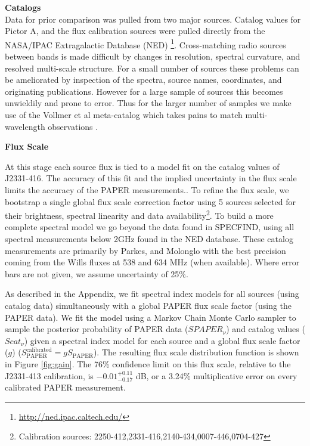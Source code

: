\documentclass[preprint]{aastex}
\newcommand{\PAPER}{\mathrm{PAPER}}
\begin{document}
\textbf{Catalogs}\\

Data for prior comparison was pulled from two major sources. Catalog values for
Pictor A, and the flux calibration sources were pulled directly from the
NASA/IPAC Extragalactic Database (NED)
\footnote{\url{http://ned.ipac.caltech.edu/}}. Cross-matching radio sources
between bands is made difficult by changes in resolution, spectral curvature,
and resolved multi-scale structure.  For a small number of sources these
problems can be ameliorated by inspection of the spectra, source names,
coordinates,  and originating publications. However for a large sample of
sources this becomes unwieldily and prone to error. Thus for the larger number
of samples we make use of the Vollmer et al meta-catalog which takes pains to
match multi-wavelength observations \citep{Vollmer:2010p6422}.


\textbf{Flux Scale}\\
\label{sec:flux_scale}

At this stage each source flux is tied to a model fit on the catalog values of
J2331-416. The accuracy of this fit and the implied uncertainty in the flux
scale limits the accuracy of the PAPER measurements..  To refine the flux
scale, we bootstrap a single global flux scale correction factor using 5
sources selected for their brightness, spectral linearity and data
availability\footnote{Calibration sources:
2250-412,2331-416,2140-434,0007-446,0704-427}. To build a more complete
spectral model we go beyond the data found in SPECFIND, using all spectral
measurements below 2GHz found in the NED database.  These catalog measurements
are primarily by Parkes, and Molonglo with the best precision coming from the
Wills fluxes at 538 and 634 MHz (when available). Where error bars are not
given, we assume uncertainty of 25\%. 

As described in the Appendix, we fit spectral index models for all sources
(using catalog data) simultaneously with a global PAPER flux scale factor
(using the PAPER data). We fit the model using a Markov Chain Monte Carlo
sampler to sample the posterior probability of PAPER data ($SPAPER_{\nu}$) and
catalog values ($Scat_{\nu}$) given a spectral index model for each source and
a global flux scale factor ($g$) ($S_\PAPER^\textrm{calibrated} = g S_\PAPER$).
The resulting flux scale distribution function is shown in Figure
\ref{fig:gain}. The 76\% confidence limit on this flux scale, relative to the
J2331-413 calibration, is  $-0.01 ^{+0.11}_{-0.17}$ dB, or a 3.24\%
multiplicative error on every calibrated PAPER measurement.  
\end{document}

